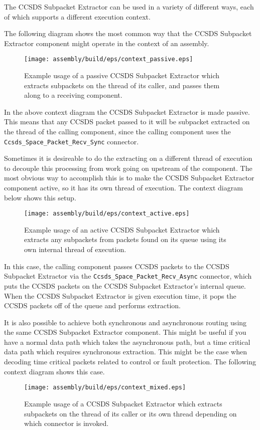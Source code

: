 The CCSDS Subpacket Extractor can be used in a variety of different ways, each of which supports a different execution context.

The following diagram shows the most common way that the CCSDS Subpacket Extractor component might operate in the context of an assembly.

\begin{figure}[H]
  \texttt{[image: assembly/build/eps/context\_passive.eps]}
  \caption{Example usage of a passive CCSDS Subpacket Extractor which extracts subpackets on the thread of its caller, and passes them along to a receiving component.}
\end{figure}

In the above context diagram the CCSDS Subpacket Extractor is made passive. This means that any CCSDS packet passed to it will be subpacket extracted on the thread of the calling component, since the calling component uses the \texttt{Ccsds\_Space\_Packet\_Recv\_Sync} connector.

Sometimes it is desireable to do the extracting on a different thread of execution to decouple this processing from work going on upstream of the component. The most obvious way to accomplish this is to make the CCSDS Subpacket Extractor component active, so it has its own thread of execution. The context diagram below shows this setup.

\begin{figure}[H]
  \texttt{[image: assembly/build/eps/context\_active.eps]}
  \caption{Example usage of an active CCSDS Subpacket Extractor which extracts any subpackets from packets found on its queue using its own internal thread of execution.}
\end{figure}

In this case, the calling component passes CCSDS packets to the CCSDS Subpacket Extractor via the \texttt{Ccsds\_Space\_Packet\_Recv\_Async} connector, which puts the CCSDS packets on the CCSDS Subpacket Extractor's internal queue. When the CCSDS Subpacket Extractor is given execution time, it pops the CCSDS packets off of the queue and performs extraction.

It is also possible to achieve both synchronous and asynchronous routing using the same CCSDS Subpacket Extractor component. This might be useful if you have a normal data path which takes the asynchronous path, but a time critical data path which requires synchronous extraction. This might be the case when decoding time critical packets related to control or fault protection. The following context diagram shows this case.

\begin{figure}[H]
  \texttt{[image: assembly/build/eps/context\_mixed.eps]}
  \caption{Example usage of a CCSDS Subpacket Extractor which extracts subpackets on the thread of its caller or its own thread depending on which connector is invoked.}
\end{figure}
